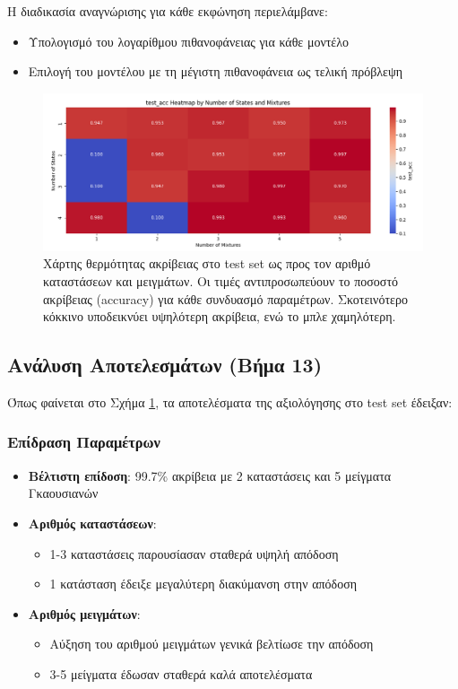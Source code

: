 \documentclass[a4paper,12pt]{article}
\begin{document}
Η διαδικασία αναγνώρισης για κάθε εκφώνηση περιελάμβανε:
\begin{itemize}
    \item Υπολογισμό του λογαρίθμου πιθανοφάνειας για κάθε μοντέλο
    \item Επιλογή του μοντέλου με τη μέγιστη πιθανοφάνεια ως τελική πρόβλεψη
\end{itemize}

\begin{figure}[h]
    \centering
    \includegraphics[width=\textwidth]{hmm_test_acc_heatmap.png}
    \caption{Χάρτης θερμότητας ακρίβειας στο test set ως προς τον αριθμό καταστάσεων και μειγμάτων. 
    Οι τιμές αντιπροσωπεύουν το ποσοστό ακρίβειας (accuracy) για κάθε συνδυασμό παραμέτρων. 
    Σκοτεινότερο κόκκινο υποδεικνύει υψηλότερη ακρίβεια, ενώ το μπλε χαμηλότερη.}
    \label{fig:test_acc_heatmap}
\end{figure}

\subsection*{Ανάλυση Αποτελεσμάτων (Βήμα 13)}
Όπως φαίνεται στο Σχήμα \ref{fig:test_acc_heatmap}, τα αποτελέσματα της αξιολόγησης στο test set έδειξαν:

\subsubsection*{Επίδραση Παραμέτρων}
\begin{itemize}
    \item \textbf{Βέλτιστη επίδοση}: 99.7\% ακρίβεια με 2 καταστάσεις και 5 μείγματα Γκαουσιανών
    \item \textbf{Αριθμός καταστάσεων}:
          \begin{itemize}
              \item 1-3 καταστάσεις παρουσίασαν σταθερά υψηλή απόδοση
              \item 1 κατάσταση έδειξε μεγαλύτερη διακύμανση στην απόδοση
          \end{itemize}
    \item \textbf{Αριθμός μειγμάτων}:
          \begin{itemize}
              \item Αύξηση του αριθμού μειγμάτων γενικά βελτίωσε την απόδοση
              \item 3-5 μείγματα έδωσαν σταθερά καλά αποτελέσματα
          \end{itemize}
\end{itemize}
\end{document}
